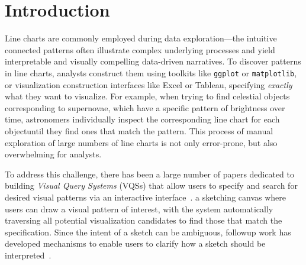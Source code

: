 \vspace{-5pt}
\section{Introduction\label{sec:intro}}
Line charts are commonly employed during data exploration---the intuitive connected patterns often illustrate complex underlying processes
and yield interpretable and visually compelling data-driven narratives. To discover patterns in line charts, analysts construct them
using toolkits like \texttt{ggplot} or \texttt{matplotlib}, or visualization construction interfaces like Excel or Tableau, specifying
{\em exactly} what they want to visualize. For example, when trying to find celestial objects corresponding to supernovae, which have a specific pattern of brightness over time, astronomers individually inspect the corresponding line chart for each objectuntil they find ones that match the pattern.  This process of manual exploration of large numbers of line charts  is not only error-prone, but also overwhelming for analysts.
\par To address this challenge, there has been a large number of papers dedicated to building {\em Visual Query Systems} (VQSs) that allow users to specify and search for desired visual patterns via an interactive interface~\cite{mohebbi2011google,Hochheiser2004,wattenberg2001sketching,Siddiqui2017VLDB,ryall2005querylines,correll2016semantics,Mannino2018,Eichmann2015,Holz2009}.  a sketching canvas where users can draw a visual pattern of interest, with the system automatically traversing all potential visualization candidates to find those that match the specification. Since the intent of a sketch can be ambiguous, followup work has developed mechanisms to enable users to clarify how a sketch should be interpreted~\cite{ryall2005querylines,correll2016semantics,Mannino2018,Eichmann2015,Holz2009}.
